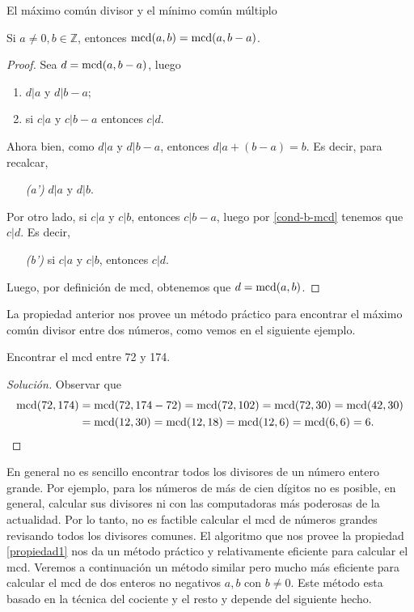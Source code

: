 \begin{section}{El máximo común divisor y el mínimo común múltiplo}
\begin{propiedad}\label{propiedad1}
    Si $a \not=0, b \in \mathbb Z$, entonces $\operatorname{mcd}(a,b) = \operatorname{mcd}(a,b-a)$. 
\end{propiedad}
\begin{proof}
    Sea $d =  \operatorname{mcd}(a,b-a)$, luego 
    \begin{enumerate}[label=\textit{\alph*)}]
        \item $ d|a$ y $d|b -a$;
        \item\label{cond-b-mcd} si $ c|a $ y $c|b -a$ entonces $ c|d$.
    \end{enumerate}
    Ahora bien, como  $ d|a$ y $d|b -a$, entonces $  d|a +(b -a) = b$. Es decir, para recalcar,
    \begin{enumerate}
        \item[\textit{(a')}] $ d|a$ y $d|b$.
    \end{enumerate}
    Por otro lado, si  $ c|a $ y $c|b$, entonces  $c|b -a$, luego por \ref{cond-b-mcd} tenemos que $c|d$. Es decir, 
    \begin{enumerate}
        \item[\textit{(b')}]si  $ c|a $ y $c|b$, entonces  $c|d$.
    \end{enumerate}
    Luego, por definición de mcd, obtenemos que $d = \operatorname{mcd}(a,b)$.
\end{proof}

La propiedad anterior nos provee un método práctico para encontrar el máximo común divisor entre dos números, como vemos en el siguiente ejemplo.

\begin{ejemplo*} Encontrar el mcd entre 72 y 174.
    \begin{proof}[Solución] Observar que 
        \begin{align*}
        \operatorname{mcd}(72, 174) &= \operatorname{mcd}(72,174-72) = \operatorname{mcd}(72,102) = \operatorname{mcd}(72,30) =  \operatorname{mcd}(42, 30) \\&= \operatorname{mcd}(12,30) = \operatorname{mcd}(12,18)= \operatorname{mcd}(12,6)= \operatorname{mcd}(6,6) = 6.  
        \end{align*}
    \end{proof}
\end{ejemplo*} 

En  general no es sencillo encontrar todos los divisores de un número entero grande. Por ejemplo, para los  números de más de cien dígitos no es posible,  en general, calcular sus divisores ni con las computadoras más poderosas de la actualidad. Por  lo tanto, no es factible calcular el  mcd de números grandes revisando todos los divisores comunes.  El algoritmo que nos provee la  propiedad \ref{propiedad1} nos da un método práctico y relativamente eficiente para calcular el mcd. Veremos a continuación un método similar pero mucho más eficiente para calcular el mcd de dos enteros no negativos $a,b$ con $b \not=0$. Este método esta basado en la técnica del cociente y el resto y depende del siguiente hecho.


\end{section}

